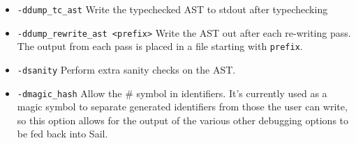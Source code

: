\begin{itemize}
\item \verb+-ddump_tc_ast+ Write the typechecked AST to stdout after
  typechecking

\item \verb+-ddump_rewrite_ast <prefix>+ Write the AST out after each
  re-writing pass. The output from each pass is placed in a file
  starting with \verb+prefix+.

\item \verb+-dsanity+ Perform extra sanity checks on the AST.

\item \verb+-dmagic_hash+ Allow the \# symbol in identifiers. It's
  currently used as a magic symbol to separate generated identifiers
  from those the user can write, so this option allows for the output
  of the various other debugging options to be fed back into Sail.
\end{itemize}
